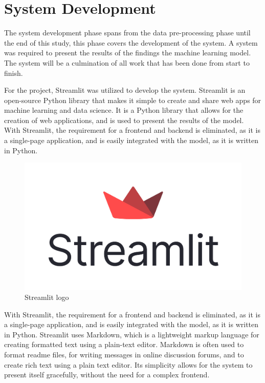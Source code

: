 \newpage
\section{System Development}
The system development phase spans from the data pre-processing phase until the end of this study, this phase covers the development of the system. A system was required to present the results of the findings the machine learning model. The system will be a culmination of all work that has been done from start to finish. 

For the project, Streamlit was utilized to develop the system. Streamlit is an open-source Python library that makes it simple to create and share web apps for machine learning and data science. It is a Python library that allows for the creation of web applications, and is used to present the results of the model. With Streamlit, the requirement for a frontend and backend is eliminated, as it is a single-page application, and is easily integrated with the model, as it is written in Python.

\begin{figure}[h]
    \centering
    \includegraphics[scale=0.1]{mainmatter/images/research methodology/streamlit.png}
    \caption{Streamlit logo}
    \label{fig:streamlit}
\end{figure}

With Streamlit, the requirement for a frontend and backend is eliminated, as it is a single-page application, and is easily integrated with the model, as it is written in Python. Streamlit uses Markdown, which is a lightweight markup language for creating formatted text using a plain-text editor. Markdown is often used to format readme files, for writing messages in online discussion forums, and to create rich text using a plain text editor. Its simplicity allows for the system to present itself gracefully, without the need for a complex frontend.


